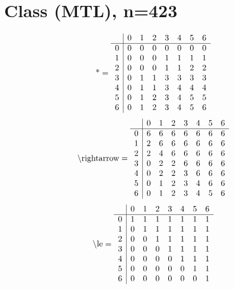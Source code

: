 \documentclass[11pt]{article}
\begin{document}
\section{Class (MTL), n=423}
\[\text{*} = 
\begin{array}{r | r r r r r r r}
 & 0 & 1 & 2 & 3 & 4 & 5 & 6 \\ \hline
0 & 0 & 0 & 0 & 0 & 0 & 0 & 0 \\
1 & 0 & 0 & 0 & 1 & 1 & 1 & 1 \\
2 & 0 & 0 & 0 & 1 & 1 & 2 & 2 \\
3 & 0 & 1 & 1 & 3 & 3 & 3 & 3 \\
4 & 0 & 1 & 1 & 3 & 4 & 4 & 4 \\
5 & 0 & 1 & 2 & 3 & 4 & 5 & 5 \\
6 & 0 & 1 & 2 & 3 & 4 & 5 & 6 \\
\end{array}
\]
\[\text{\textbackslash rightarrow} = 
\begin{array}{r | r r r r r r r}
 & 0 & 1 & 2 & 3 & 4 & 5 & 6 \\ \hline
0 & 6 & 6 & 6 & 6 & 6 & 6 & 6 \\
1 & 2 & 6 & 6 & 6 & 6 & 6 & 6 \\
2 & 2 & 4 & 6 & 6 & 6 & 6 & 6 \\
3 & 0 & 2 & 2 & 6 & 6 & 6 & 6 \\
4 & 0 & 2 & 2 & 3 & 6 & 6 & 6 \\
5 & 0 & 1 & 2 & 3 & 4 & 6 & 6 \\
6 & 0 & 1 & 2 & 3 & 4 & 5 & 6 \\
\end{array}
\]
\[\text{\textbackslash le} = 
\begin{array}{r | r r r r r r r}
 & 0 & 1 & 2 & 3 & 4 & 5 & 6 \\ \hline
0 & 1 & 1 & 1 & 1 & 1 & 1 & 1 \\
1 & 0 & 1 & 1 & 1 & 1 & 1 & 1 \\
2 & 0 & 0 & 1 & 1 & 1 & 1 & 1 \\
3 & 0 & 0 & 0 & 1 & 1 & 1 & 1 \\
4 & 0 & 0 & 0 & 0 & 1 & 1 & 1 \\
5 & 0 & 0 & 0 & 0 & 0 & 1 & 1 \\
6 & 0 & 0 & 0 & 0 & 0 & 0 & 1 \\
\end{array}
\]
\end{document}
